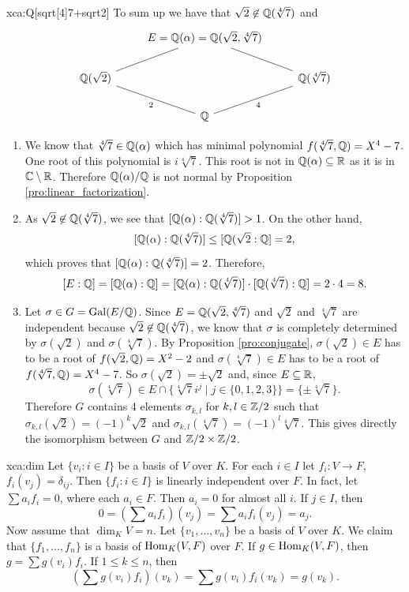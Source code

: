 \begin{sol}{xca:Q[sqrt[4]{7}+sqrt{2}]}
To sum up we have that $\sqrt{2}\not\in \mathbb{Q}(\sqrt[4]{7})$ and
\[
\begin{tikzcd}
	& {E=\Q(\alpha)=\Q(\sqrt{2},\sqrt[4]{7})}\arrow[rd,no head]\\
	{\Q(\sqrt{2})}\arrow[ru,no head,]&& {\Q(\sqrt[4]{7})}\arrow[ld,no head,"4"]  \\
	& {\Q}\arrow[lu,no head,"2"] 
 \end{tikzcd}
\]
\begin{enumerate}
    \item We know that $\sqrt[4]{7} \in \mathbb{Q}(\alpha)$ 
    which has minimal polynomial $f(\sqrt[4]{7},\mathbb{Q}) = X^4-7$.
    One root of this polynomial is $i\sqrt[4]{7}$.
    This root is not in $\mathbb{Q}(\alpha)\subseteq \mathbb{R}$ as it is in $\mathbb{C}\setminus\mathbb{R}$. 
    Therefore $\mathbb{Q}(\alpha)/\mathbb{Q}$ is not normal by Proposition \ref{pro:linear_factorization}.
    \item  As $\sqrt{2} \not\in \mathbb{Q}(\sqrt[4]{7})$,
    we see that $[\mathbb{Q}(\alpha):\mathbb{Q}(\sqrt[4]{7})] > 1$.
    On the other hand, 
    $$[\mathbb{Q}(\alpha):\mathbb{Q}(\sqrt[4]{7})] \leq [\mathbb{Q}(\sqrt{2}:\mathbb{Q}]=2,$$
    which proves that $[\mathbb{Q}(\alpha):\mathbb{Q}(\sqrt[4]{7})] = 2$.
    Therefore,
    \[
     [E:\mathbb{Q}]=[\mathbb{Q}(\alpha):\mathbb{Q}] = [\mathbb{Q}(\alpha):\mathbb{Q}(\sqrt[4]{7})] \cdot [\mathbb{Q}(\sqrt[4]{7}): \mathbb{Q}] = 2 \cdot 4 = 8.
    \]
    \item Let $\sigma\in G=\operatorname{Gal}(E/\mathbb{Q})$.
    Since $E=\mathbb{Q}(\sqrt{2},\sqrt[4]{7})$ and 
    $\sqrt{2}$ and $\sqrt[4]{7}$ are independent 
    because $\sqrt{2}\not\in \mathbb{Q}(\sqrt[4]{7})$,
    we know that $\sigma$ is completely determined
    by $\sigma(\sqrt{2})$ and $\sigma(\sqrt[4]{7})$.
    By Proposition \ref{pro:conjugate},
    $\sigma(\sqrt{2})\in E$ has to be a root of $f(\sqrt{2},\mathbb{Q})=X^2-2$ 
    and $\sigma(\sqrt[4]{7})\in E$ has to be a root of $f(\sqrt[4]{7},\mathbb{Q})=X^4-7$.
    So $\sigma(\sqrt{2})=\pm\sqrt{2}$ and, since $E\subseteq \mathbb{R}$,
    $$\sigma(\sqrt[4]{7})\in E\cap\{\sqrt[4]{7}i^j\mid j\in\{0,1,2,3\}\}=\{\pm\sqrt[4]{7}\}.$$
    Therefore $G$ contains 4 elements $\sigma_{k,l}$ for $k,l\in \mathbb{Z}/2$
    such that $\sigma_{k,l}(\sqrt{2})=(-1)^k\sqrt{2}$ 
    and $\sigma_{k,l}(\sqrt[4]{7})=(-1)^l\sqrt[4]{7}$.
    This gives directly the isomorphism between $G$ and $\mathbb{Z}/2\times\mathbb{Z}/2$. 
\end{enumerate}
\end{sol}



\begin{sol}{xca:dim}
 Let $\{v_i:i\in I\}$ be a basis of $V$ over $K$. For each $i\in I$
 let $f_i\colon V\to F$, $f_i(v_j)=\delta_{ij}$. Then $\{f_i:i\in I\}$ is linearly 
 independent over $F$. In fact, let 
 $\sum a_if_i=0$, where each $a_i\in F$. Then 
 $a_i=0$ for almost all $i$. If $j\in I$, then 
 \[
 0=\left(\sum a_if_i\right)(v_j)=\sum a_if_i(v_j)=a_j.
 \]
 Now assume that $\dim_KV=n$. Let $\{v_1,\dots,v_n\}$ be a basis of $V$ over $K$.
 We claim that $\{f_1,\dots,f_n\}$ is a basis of $\operatorname{Hom}_K(V,F)$ over $F$. If 
 $g\in\operatorname{Hom}_K(V,F)$, then $g=\sum g(v_i)f_i$. If $1\leq k\leq n$, then
 \[
 \left(\sum g(v_i)f_i\right)(v_k)=\sum g(v_i)f_i(v_k)=g(v_k).
 \]
\end{sol}



